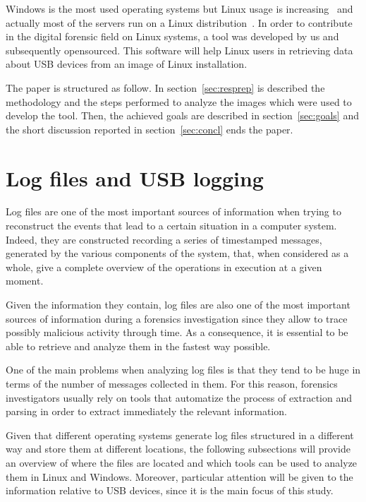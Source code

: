 \documentclass[a4paper]{article}
\begin{document}
Windows is the most used operating systems but Linux usage is
increasing~\cite{osShare} and actually most of the servers run on a Linux
distribution~\cite{InternetServer}. In order to contribute in the digital
forensic field on Linux systems, a tool was developed by us and subsequently
opensourced. This software will help Linux users in retrieving data about USB
devices from an image of Linux installation.

The paper is structured as follow. In section~\ref{sec:resprep} is described the
methodology and the steps performed to analyze the images which were used to
develop the tool. Then, the achieved goals are described in
section~\ref{sec:goals} and the short discussion reported in
section~\ref{sec:concl} ends the paper.

\section{Log files and USB logging}
\label{sec:lit}
Log files are one of the most important sources of information when trying to
reconstruct the events that lead to a certain situation in a computer system.
Indeed, they are constructed recording a series of timestamped messages,
generated by the various components of the system, that, when considered as a
whole, give a complete overview of the operations in execution at a given
moment.

Given the information they contain, log files are also one of the most important
sources of information during a forensics investigation since they allow to
trace possibly malicious activity through time. As a consequence, it is
essential to be able to retrieve and analyze them in the fastest way
possible.~\cite{finlayson1987log}

One of the main problems when analyzing log files is that they tend to be huge
in terms of the number of messages collected in them. For this reason, forensics
investigators usually rely on tools that automatize the process of extraction
and parsing in order to extract immediately the relevant information.

Given that different operating systems generate log files structured in a
different way and store them at different locations, the following subsections
will provide an overview of where the files are located and which tools can
be used to analyze them in Linux and Windows. Moreover, particular attention
will be given to the information relative to USB devices, since it is the main
focus of this study.
\end{document}
